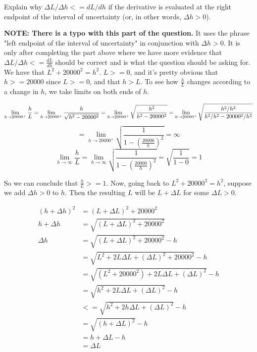 \documentclass[9pt]{article}
\begin{document}
\begin{tcolorbox}
  Explain why $\Delta L / \Delta h <= dL / dh$ if the derivative is evaluated at the right endpoint of the interval of uncertainty (or, in other words, $\Delta h > 0$).
\end{tcolorbox}

\textbf{NOTE: There is a typo with this part of the question.} It uses the phrase "left endpoint of the interval of uncertainty" in conjunction with $\Delta h > 0$. It is only after completing the part above where we have more evidence that $\Delta L / \Delta h <= \frac{dL}{dh}$ should be correct and is what the question should be asking for. \\

We have that $L^2 + 20000^2 = h^2$. $L >= 0$, and it's pretty obvious that $h >= 20000$ since $L >= 0$, and that $h > L$. To see how $\frac{h}{L}$ changes according to a change in $h$, we take limits on both ends of $h$.

\begin{equation*}
  \lim_{h\to20000^+} \frac{h}{L} = \lim_{h\to20000^+} \frac{h}{\sqrt{h^2 - 20000^2}}
                                 = \lim_{h\to20000^+} \sqrt{\frac{h^2}{h^2 - 20000^2}}
                                 = \lim_{h\to20000^+} \sqrt{\frac{h^2 / h^2}{h^2 / h^2 - 20000^2 / h^2}} \\
\end{equation*}
\begin{equation*}
  = \lim_{h\to20000^+} \sqrt{\frac{1}{1 - (\frac{20000}{h})^2}} = \infty
\end{equation*}
\begin{equation*}
  \lim_{h\to\infty} \frac{h}{L} = \lim_{h\to\infty} \sqrt{\frac{1}{1 - (\frac{20000}{h})^2}} = \sqrt{\frac{1}{1 - 0}} = 1
\end{equation*}

So we can conclude that $\frac{h}{L} >= 1$. Now, going back to $L^2 + 20000^2 = h^2$, suppose we add $\Delta h > 0$ to $h$. Then the resulting $L$ will be $L + \Delta L$ for some $\Delta L > 0$.

\begin{align*}
  (h + \Delta h)^2 &= (L + \Delta L)^2 + 20000^2 \\
  h + \Delta h &= \sqrt{(L + \Delta L)^2 + 20000^2} \\
  \Delta h &= \sqrt{(L + \Delta L)^2 + 20000^2} - h \\
           &= \sqrt{L^2 + 2L\Delta L + (\Delta L)^2 + 20000^2} - h \\
           &= \sqrt{(L^2 + 20000^2) + 2L\Delta L + (\Delta L)^2} - h \\
           &= \sqrt{h^2 + 2L\Delta L + (\Delta L)^2} - h \\
           &<= \sqrt{h^2 + 2h\Delta L + (\Delta L)^2} - h \tag*{(Since $h >= L$ and $\Delta L > 0$)} \\
           &= \sqrt{(h + \Delta L)^2} - h \\
           &= h + \Delta L - h \\
           &= \Delta L
\end{align*}
\end{document}
